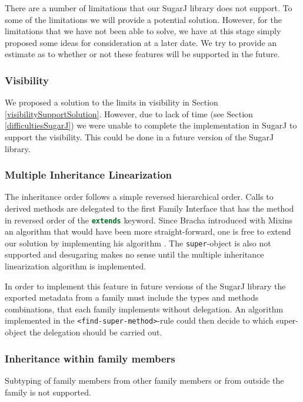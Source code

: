 \documentclass{report}
\begin{document}
There are a number of limitations that our SugarJ library does not support. To some of the limitations we will provide a potential solution. However, for the limitations that we have not been able to solve, we have at this stage simply proposed some ideas for consideration at a later date. We try to provide an estimate as to whether or not these features will be supported in the future.

\subsubsection*{Visibility}

We proposed a solution to the limits in visibility in Section \ref{visibilitySupportSolution}. However, due to lack of time (see Section \ref{difficultiesSugarJ}) we were unable to complete the implementation in SugarJ to support the visibility. This could be done in a future version of the SugarJ library.

\subsubsection*{Multiple Inheritance Linearization}

The inheritance order follows a simple reversed hierarchical order. Calls to derived methods are delegated to the first Family Interface that has the method in reversed order of the \lstinline[language=java]{extends} keyword. Since Bracha introduced with Mixins an algorithm that would have been more straight-forward, one is free to extend our solution by implementing his algorithm \cite{Bracha-Mixin-1990}. The \lstinline{super}-object is also not supported and desugaring makes no sense until the multiple inheritance linearization algorithm is implemented.

In order to implement this feature in future versions of the SugarJ library the exported metadata from a family must include the types and methods combinations, that each family implements without delegation. An algorithm implemented in the \lstinline{<find-super-method>}-rule could then decide to which super-object the delegation should be carried out.

\subsubsection*{Inheritance within family members}

Subtyping of family members from other family members or from outside the family is not supported.
\end{document}
